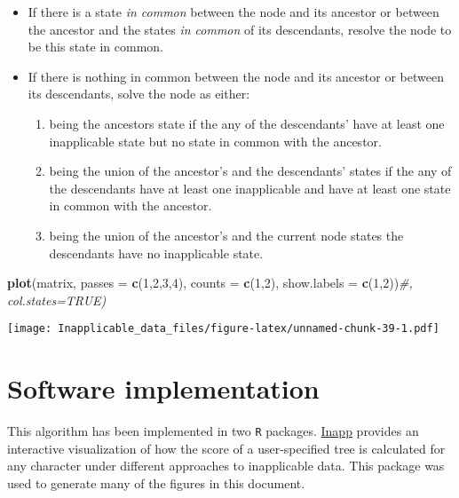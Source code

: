 \documentclass[]{book}
\newenvironment{Shaded}{\begin{snugshade}}{\end{snugshade}}
\newcommand{\KeywordTok}[1]{\textcolor[rgb]{0.13,0.29,0.53}{\textbf{#1}}}
\newcommand{\DataTypeTok}[1]{\textcolor[rgb]{0.13,0.29,0.53}{#1}}
\newcommand{\DecValTok}[1]{\textcolor[rgb]{0.00,0.00,0.81}{#1}}
\newcommand{\CommentTok}[1]{\textcolor[rgb]{0.56,0.35,0.01}{\textit{#1}}}
\newcommand{\NormalTok}[1]{#1}
\providecommand{\tightlist}{%
  \setlength{\itemsep}{0pt}\setlength{\parskip}{0pt}}
\theoremstyle{definition}
\theoremstyle{definition}
\theoremstyle{definition}
\theoremstyle{remark}
\begin{document}
\begin{itemize}
\tightlist
\item
  If there is a state \emph{in common} between the node and its ancestor
  or between the ancestor and the states \emph{in common} of its
  descendants, resolve the node to be this state in common.
\item
  If there is nothing in common between the node and its ancestor or
  between its descendants, solve the node as either:

  \begin{enumerate}
  \def\labelenumi{\arabic{enumi}.}
  \tightlist
  \item
    being the ancestors state if the any of the descendants' have at
    least one inapplicable state but no state in common with the
    ancestor.
  \item
    being the union of the ancestor's and the descendants' states if the
    any of the descendants have at least one inapplicable and have at
    least one state in common with the ancestor.
  \item
    being the union of the ancestor's and the current node states the
    descendants have no inapplicable state.
  \end{enumerate}
\end{itemize}

\begin{Shaded}
\begin{Highlighting}[]
\KeywordTok{plot}\NormalTok{(matrix, }\DataTypeTok{passes =} \KeywordTok{c}\NormalTok{(}\DecValTok{1}\NormalTok{,}\DecValTok{2}\NormalTok{,}\DecValTok{3}\NormalTok{,}\DecValTok{4}\NormalTok{), }\DataTypeTok{counts =} \KeywordTok{c}\NormalTok{(}\DecValTok{1}\NormalTok{,}\DecValTok{2}\NormalTok{), }\DataTypeTok{show.labels =} \KeywordTok{c}\NormalTok{(}\DecValTok{1}\NormalTok{,}\DecValTok{2}\NormalTok{))}\CommentTok{#, col.states=TRUE)}
\end{Highlighting}
\end{Shaded}

\texttt{[image: Inapplicable\_data\_files/figure-latex/unnamed-chunk-39-1.pdf]}

\hypertarget{software}{%
\section{Software implementation}\label{software}}

This algorithm has been implemented in two \texttt{R} packages.
\href{https://github.com/TGuillerme/Inapp}{Inapp} provides an
interactive visualization of how the score of a user-specified tree is
calculated for any character under different approaches to inapplicable
data. This package was used to generate many of the figures in this
document.
\end{document}
